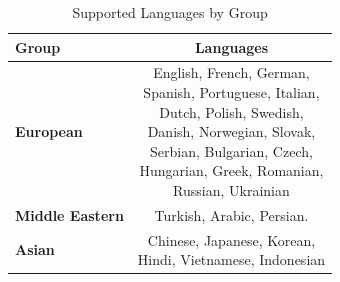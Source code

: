 \documentclass[11pt]{article} %
\begin{document}
    \begin{table}[ht]
        \centering
        \caption{\citet{dxniz2026tinystoriesmultilingual} Supported Languages by Group}
        \label{tab:languages}
        \begin{tabular}{lc}
            \toprule \textbf{Group}               & \textbf{Languages}                                                                                                                                                                                           \\
            \midrule \textbf{European}            & \makecell[c]{English, French, German, \\Spanish, Portuguese, Italian,\\Dutch, Polish, Swedish, \\Danish, Norwegian, Slovak, \\Serbian, Bulgarian, Czech, \\Hungarian, Greek, Romanian, \\Russian, Ukrainian} \\
            \addlinespace \textbf{Middle Eastern} & Turkish, Arabic, Persian.                                                                                                                                                                                    \\
            \addlinespace \textbf{Asian}          & \makecell[c]{Chinese, Japanese, Korean, \\Hindi, Vietnamese, Indonesian}                                                                                                                                     \\
            \bottomrule
        \end{tabular}
    \end{table}
\end{document}
